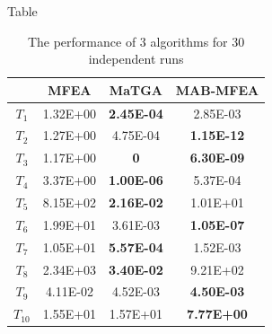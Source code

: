 \begin{frame}{Table}
    \begin{table}[]
        \begin{tabular}{|c|c|c|c|}
            \hline
            \textbf{}      & \textbf{MFEA} & \textbf{MaTGA} & \textbf{MAB-MFEA} \\ \hline \hline
            $T_1$          & 1.32E+00      & \textbf{2.45E-04}       & 2.85E-03          \\ \hline
            $T_2$          & 1.27E+00      & 4.75E-04       & \textbf{1.15E-12}          \\ \hline
            $T_3$          & 1.17E+00      & \textbf{0}              & \textbf{6.30E-09}          \\ \hline
            $T_4$          & 3.37E+00      & \textbf{1.00E-06}       & 5.37E-04          \\ \hline
            $T_5$          & 8.15E+02      & \textbf{2.16E-02}       & 1.01E+01          \\ \hline
            $T_6$          & 1.99E+01      & 3.61E-03       & \textbf{1.05E-07}          \\ \hline
            $T_7$          & 1.05E+01      & \textbf{5.57E-04}       & 1.52E-03          \\ \hline
            $T_8$          & 2.34E+03      & \textbf{3.40E-02 }      & 9.21E+02          \\ \hline
            $T_9$          & 4.11E-02      & 4.52E-03       & \textbf{4.50E-03}          \\ \hline
            $T_10$         & 1.55E+01      & 1.57E+01       & \textbf{7.77E+00}          \\ \hline
        \end{tabular}
        \caption{The performance of 3 algorithms for 30 independent runs}
    \end{table}
\end{frame}

